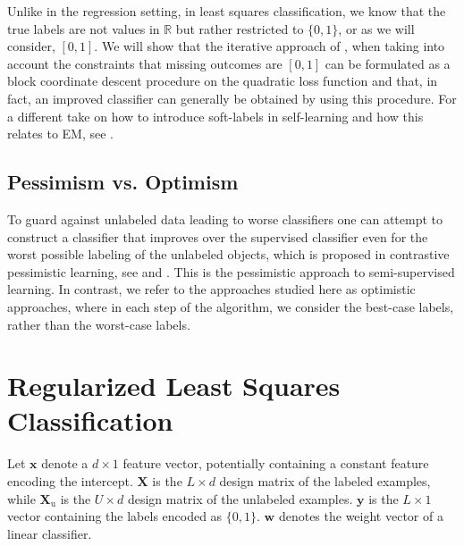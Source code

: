 \documentclass[twoside]{memoir}\usepackage[]{graphicx}\usepackage{xcolor}
\begin{document}

Unlike in the regression setting, in least squares classification, we know that the true labels are not values in $\mathbb{R}$ but rather restricted to $\{0,1\}$, or as we will consider, $[0,1]$. We will show that the iterative approach of \citet{Healy1956}, when taking into account the constraints that missing outcomes are $[0,1]$ can be formulated as a block coordinate descent procedure on the quadratic loss function and that, in fact, an improved classifier can generally be obtained by using this procedure. For a different take on how to introduce soft-labels in self-learning and how this relates to EM, see \citet{Mey2016}.

\subsection{Pessimism vs. Optimism}
To guard against unlabeled data leading to worse classifiers one can attempt to construct a classifier that improves over the supervised classifier even for the worst possible labeling of the unlabeled objects, which is proposed in contrastive pessimistic learning, see \citet{Loog2016} and \citet{Krijthe2015}. This is the pessimistic approach to semi-supervised learning. In contrast, we refer to the approaches studied here as optimistic approaches, where in each step of the algorithm, we consider the best-case labels, rather than the worst-case labels.

\section{Regularized Least Squares Classification}
Let $\mathbf{x}$ denote a $d\times 1$ feature vector, potentially containing a constant feature encoding the intercept.
$\mathbf{X}$ is the $L \times d$ design matrix of the labeled examples, while $\mathbf{X}_\text{u}$ is the  $U \times d$ design matrix of the unlabeled examples. $\mathbf{y}$ is the $L\times 1$ vector containing the labels encoded as $\{0,1\}$.
$\mathbf{w}$ denotes the weight vector of a linear classifier.
\end{document}

